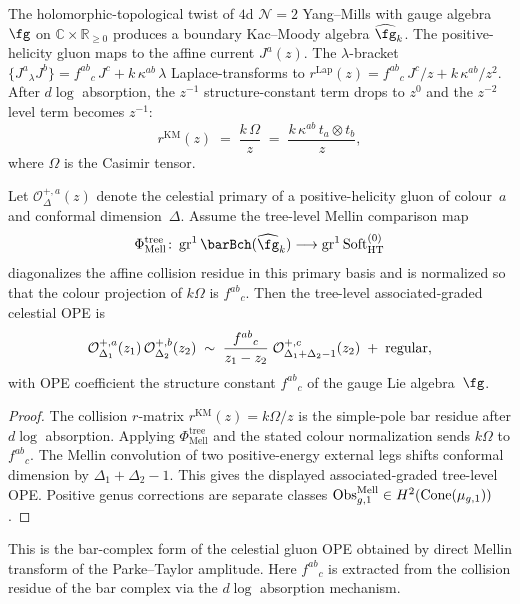 The holomorphic-topological twist of $4$d $\mathcal{N} = 2$ Yang--Mills with gauge algebra $\fg$ on $\mathbb{C} \times \mathbb{R}_{\ge 0}$ produces a boundary Kac--Moody algebra $\widehat{\fg}_k$. The positive-helicity gluon maps to the affine current $J^a(z)$. The $\lambda$-bracket $\{J^a {}_\lambda J^b\} = f^{ab}{}_c\, J^c + k\,\kappa^{ab}\,\lambda$ Laplace-transforms to $r^{\mathrm{Lap}}(z) = f^{ab}{}_c\, J^c / z + k\,\kappa^{ab}/z^2$. After $d\log$ absorption, the $z^{-1}$ structure-constant term drops to $z^0$ and the $z^{-2}$ level term becomes $z^{-1}$:
\[
r^{\mathrm{KM}}(z) \;=\; \frac{k\,\Omega}{z}
\;=\; \frac{k\,\kappa^{ab}\,t_a \otimes t_b}{z},
\]
where $\Omega$ is the Casimir tensor.

\begin{theorem}
\label{thm:ch-core-celestial-gluon-ope}
Let $\mathcal{O}^{+,a}_{\Delta}(z)$ denote the celestial primary of a positive-helicity gluon
of colour~$a$ and conformal dimension~$\Delta$. Assume the tree-level Mellin comparison map
\[
\Phi^{\mathrm{tree}}_{\mathrm{Mell}}\colon
\gr^1\barBch(\widehat{\fg}_k)\longrightarrow
\gr^1\mathrm{Soft}^{(0)}_{\mathrm{HT}}
\]
diagonalizes the affine collision residue in this primary basis and is normalized so that the
colour projection of $k\Omega$ is $f^{ab}{}_{c}$. Then the tree-level associated-graded
celestial OPE is
\[
\mathcal{O}^{+,a}_{\Delta_1}(z_1)\,\mathcal{O}^{+,b}_{\Delta_2}(z_2)
\;\sim\;
\frac{f^{ab}{}_c}{z_1 - z_2}\;
\mathcal{O}^{+,c}_{\Delta_1 + \Delta_2 - 1}(z_2)
\;+\; \textup{regular},
\]
with OPE coefficient the structure constant $f^{ab}{}_c$ of the gauge Lie algebra~$\fg$.
\end{theorem}

\begin{proof}
The collision $r$-matrix $r^{\mathrm{KM}}(z)=k\Omega/z$ is the simple-pole bar residue after
$d\log$ absorption. Applying $\Phi^{\mathrm{tree}}_{\mathrm{Mell}}$ and the stated colour
normalization sends $k\Omega$ to $f^{ab}{}_{c}$. The Mellin convolution of two positive-energy
external legs shifts conformal dimension by
\(\Delta_1+\Delta_2-1\). This gives the displayed associated-graded tree-level OPE. Positive
genus corrections are separate classes
\(\operatorname{Obs}^{\mathrm{Mell}}_{g,1}\in H^2(\operatorname{Cone}(\mu_{g,1}))\).
\end{proof}

\begin{remark}
\label{rem:ch-core-fft}
This is the bar-complex form of the celestial gluon OPE obtained by direct Mellin transform
of the Parke--Taylor amplitude. Here $f^{ab}{}_c$ is extracted from the collision residue of
the bar complex via the $d\log$ absorption mechanism.
\end{remark}


